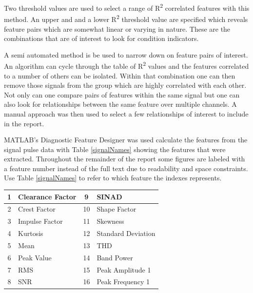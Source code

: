 \documentclass[]{article}
\begin{document}
Two threshold values are used to select a range of R\textsuperscript{2} correlated features with this method. An upper and and a lower R\textsuperscript{2} threshold value are specified which reveals feature pairs which are somewhat linear or varying in nature. These are the combinations that are of interest to look for condition indicators.

A semi automated method is be used to narrow down on feature pairs of interest. An algorithm can cycle through the table of R\textsuperscript{2} values and the features correlated to a number of others can be isolated. Within that combination one can then remove those signals from the group which are highly correlated with each other. Not only can one compare pairs of features within the same signal but one can also look for relationships between the same feature over multiple channels. A manual approach was then used to select a few relationships of interest to include in the report.

MATLAB's Diagnostic Feature Designer was used calculate the features from the signal pulse data with Table \ref{signalNames} showing the features that were extracted. Throughout the remainder of the report some figures are labeled with a feature number instead of the full text due to readability and space constraints. Use Table \ref{signalNames} to refer to which feature the indexes represents.

\begin{center}
\label{featureNames}
\begin{tabular}{ |c|l|c|l| }
 \hline
 1 & Clearance Factor & 9 & \gls{SINAD}\\
 \hline
 2 & Crest Factor & 10 & Shape Factor\\
 \hline
 3 & Impulse Factor & 11 & Skewness\\
 \hline
 4 & Kurtosis & 12 & Standard Deviation\\
 \hline
 5 & Mean & 13 & \gls{THD}\\
 \hline
 6 & Peak Value &  14 & Band Power \\
 \hline
 7 & \gls{RMS} & 15 & Peak Amplitude 1\\ 
 \hline              
 8 & \gls{SNR} & 16 & Peak Frequency 1 \\
 \hline        
\end{tabular}
\end{center}
\end{document}
